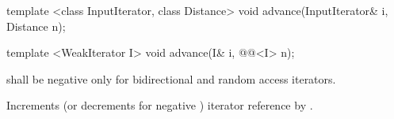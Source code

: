 %
\begin{removedblock}
\begin{itemdecl}
template <class InputIterator, class Distance>
  void advance(InputIterator& i, Distance n);
\end{itemdecl}
\end{removedblock}
\begin{addedblock}
\begin{itemdecl}
template <WeakIterator I>
  void advance(I& i, @@<I> n);
\end{itemdecl}
\end{addedblock}

\begin{itemdescr}
\pnum
\requires
{}
shall be negative only for bidirectional and random access iterators.

\pnum
\effects
Increments (or decrements for negative
)
iterator reference
by
.
\end{itemdescr}

